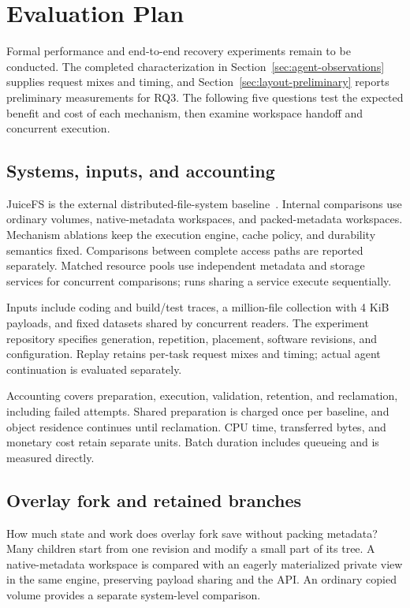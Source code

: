 \section{Evaluation Plan}
\label{sec:evaluation}

Formal performance and end-to-end recovery experiments remain to be conducted.
The completed characterization in Section~\ref{sec:agent-observations}
supplies request mixes and timing, and
Section~\ref{sec:layout-preliminary} reports preliminary measurements
for RQ3. The following five questions test
the expected benefit and cost of each mechanism, then examine workspace
handoff and concurrent execution.

\subsection{Systems, inputs, and accounting}

JuiceFS is the external distributed-file-system
baseline~\cite{juicefs_architecture}. Internal comparisons use ordinary
volumes, native-metadata workspaces, and packed-metadata workspaces.
Mechanism ablations keep the execution engine, cache policy, and
durability semantics fixed. Comparisons between complete access paths
are reported separately. Matched resource pools use independent metadata
and storage services for concurrent comparisons; runs sharing a service
execute sequentially.

Inputs include coding and build/test traces, a million-file collection
with 4 KiB payloads, and fixed datasets shared by concurrent readers.
The experiment repository specifies generation, repetition, placement,
software revisions, and configuration. Replay retains per-task request
mixes and timing; actual agent continuation is evaluated separately.

Accounting covers preparation, execution, validation, retention, and
reclamation, including failed attempts. Shared preparation is charged
once per baseline, and object residence continues until reclamation.
CPU time, transferred bytes, and monetary cost retain separate units.
Batch duration includes queueing and is measured directly.

\subsection{Overlay fork and retained branches}

 How much state and work does overlay fork save without
packing metadata?
Many children start from one revision and modify a small part of its
tree. A native-metadata workspace is compared with an eagerly
materialized private view in the same engine, preserving payload
sharing and the API. An ordinary copied volume provides a separate
system-level comparison.

